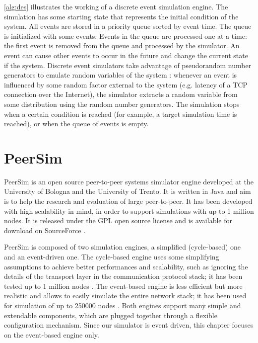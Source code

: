 \cref{alg:des} illustrates the working of a discrete event simulation engine.
The simulation has some starting state that represents the initial condition of the system.
All events are stored in a priority queue sorted by event time.
The queue is initialized with some events.
Events in the queue are processed one at a time:
the first event is removed from the queue and processed by the simulator.
An event can cause other events to occur in the future and change the current state if the system.
Discrete event simulators take advantage of pseudorandom number generators to emulate random variables of the system \cite{wikipedia_des}:
whenever an event is influenced by some random factor external to the system (e.g. latency of a TCP connection over the Internet), the simulator extracts a random variable from some distribution using the random number generators.
The simulation stops when a certain condition is reached (for example, a target simulation time is reached), or when the queue of events is empty.


\section{PeerSim}
PeerSim \cite{peersim_2009} is an open source peer-to-peer systems simulator engine developed at the University of Bologna and the University of Trento.
It is written in Java and aim is to help the research and evaluation of large peer-to-peer.
It has been developed with high scalability in mind, in order to support simulations with up to \num{1} million nodes.
It is released under the GPL open source license and is available for download on SourceForce \cite{peersim_site}.

\smallskip
PeerSim is composed of two simulation engines, a simplified (cycle-based) one and an event-driven one.
The cycle-based engine uses some simplifying assumptions to achieve better performances and scalability, such as ignoring the details of the transport layer in the communication protocol stack;
it has been tested up to \num{1} million nodes \cite{peersim_intro_2018}.
The event-based engine is less efficient but more realistic and allows to easily simulate the entire network stack;
it has been used for simulation of up to \num{250000} nodes \cite{peersim_intro_2018}.
Both engines support many simple and extendable components, which are plugged together through a flexible configuration mechanism.
Since our simulator is event driven, this chapter focuses on the event-based engine only.


